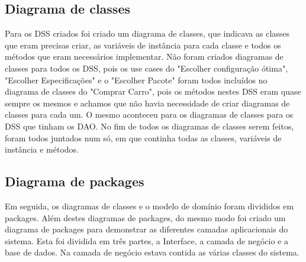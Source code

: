 \documentclass[10pt, a4paper]{article}
\begin{document}
\subsection{Diagrama de classes}
Para os DSS criados foi criado um diagrama de classes, que indicava as classes que eram precisas criar, as variáveis de instância para cada classe e todos os métodos que eram necessários implementar. Não foram criados diagramas de classes para todos os DSS, pois os use cases do "Escolher configuração ótima", "Escolher Especificações" e o "Escolher Pacote" foram todos incluídos no diagrama de classes do "Comprar Carro", pois os métodos nestes DSS eram quase sempre os mesmos e achamos que não havia necessidade de criar diagramas de classes para cada um. O mesmo aconteceu para os diagramas de classes para os DSS que tinham os DAO.
No fim de todos os diagramas de classes serem feitos, foram todos juntados num só, em que continha todas as classes, variáveis de instância e métodos.
\subsection{Diagrama de packages}
Em seguida, os diagramas de classes e o modelo de domínio foram divididos em packages. Além destes diagramas de packages, do mesmo modo foi criado um diagrama de packages para demonstrar as diferentes camadas aplicacionais do sistema. Esta foi dividida em três partes, a Interface, a camada de negócio e a base de dados. Na camada de negócio estava contida as várias classes do sistema.
\end{document}
